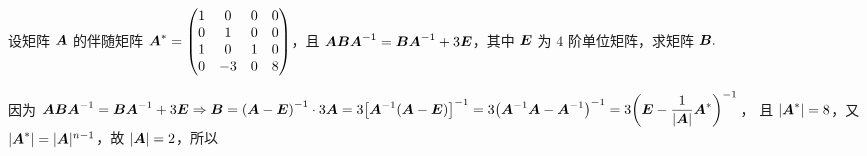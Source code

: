 \begin{example}
    设矩阵 $\vb*{A}$ 的伴随矩阵 $\vb*{A}^*=\begin{pmatrix}
            1 & 0  & 0 & 0 \\
            0 & 1  & 0 & 0 \\
            1 & 0  & 1 & 0 \\
            0 & -3 & 0 & 8
        \end{pmatrix}$，且 $\vb*{ABA}^{-1}=\vb*{BA}^{-1}+3\vb*{E}$，其中 $\vb*{E}$ 为 $4$ 阶单位矩阵，求矩阵 $\vb*{B}.$
    \label{ABA}
\end{example}
\begin{solution}
    因为 $\vb*{ABA}^{-1}=\vb*{BA}^{-1}+3\vb*{E}\Rightarrow \vb*{B}=\qty(\vb*{A}-\vb*{E})^{-1}\cdot 3\vb*{A}=3\qty[\vb*{A}^{-1}\qty(\vb*{A}-\vb*{E})]^{-1}=3\qty(\vb*{A}^{-1}\vb*{A}-\vb*{A}^{-1})^{-1}=3\qty(\vb*{E}-\dfrac{1}{|\vb*{A}|}\vb*{A}^*)^{-1}$，
    且 $|\vb*{A}^*|=8$，又 $|\vb*{A}^*|=|\vb*{A}|^{n-1}$，故 $|\vb*{A}|=2$，所以
\end{solution}
